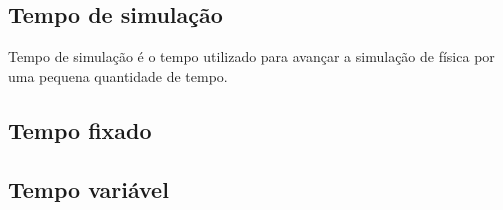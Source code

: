 \subsection{Tempo de simulação}
Tempo de simulação é o tempo utilizado para avançar a simulação de física por uma pequena quantidade de tempo.

\subsection{Tempo fixado}

\subsection{Tempo variável}
